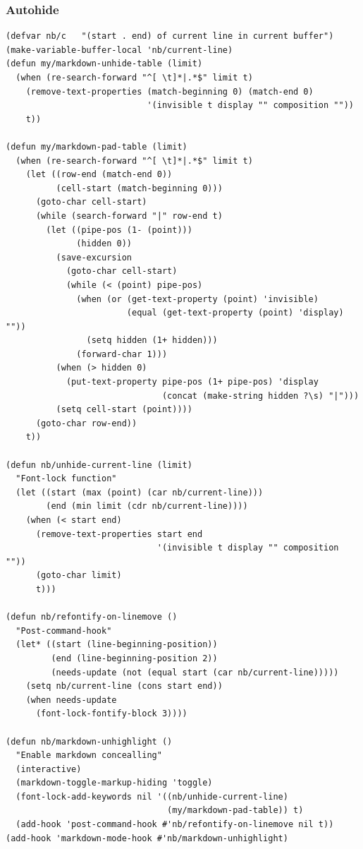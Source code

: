 \documentclass[11pt]{article}
\begin{document}
\subsubsection{Autohide}
\label{sec:orge6439c6}

\begin{verbatim}
(defvar nb/c   "(start . end) of current line in current buffer")
(make-variable-buffer-local 'nb/current-line)
(defun my/markdown-unhide-table (limit)
  (when (re-search-forward "^[ \t]*|.*$" limit t)
    (remove-text-properties (match-beginning 0) (match-end 0)
                            '(invisible t display "" composition ""))
    t))

(defun my/markdown-pad-table (limit)
  (when (re-search-forward "^[ \t]*|.*$" limit t)
    (let ((row-end (match-end 0))
          (cell-start (match-beginning 0)))
      (goto-char cell-start)
      (while (search-forward "|" row-end t)
        (let ((pipe-pos (1- (point)))
              (hidden 0))
          (save-excursion
            (goto-char cell-start)
            (while (< (point) pipe-pos)
              (when (or (get-text-property (point) 'invisible)
                        (equal (get-text-property (point) 'display) ""))
                (setq hidden (1+ hidden)))
              (forward-char 1)))
          (when (> hidden 0)
            (put-text-property pipe-pos (1+ pipe-pos) 'display
                               (concat (make-string hidden ?\s) "|")))
          (setq cell-start (point))))
      (goto-char row-end))
    t))

(defun nb/unhide-current-line (limit)
  "Font-lock function"
  (let ((start (max (point) (car nb/current-line)))
        (end (min limit (cdr nb/current-line))))
    (when (< start end)
      (remove-text-properties start end
                              '(invisible t display "" composition ""))
      (goto-char limit)
      t)))

(defun nb/refontify-on-linemove ()
  "Post-command-hook"
  (let* ((start (line-beginning-position))
         (end (line-beginning-position 2))
         (needs-update (not (equal start (car nb/current-line)))))
    (setq nb/current-line (cons start end))
    (when needs-update
      (font-lock-fontify-block 3))))

(defun nb/markdown-unhighlight ()
  "Enable markdown concealling"
  (interactive)
  (markdown-toggle-markup-hiding 'toggle)
  (font-lock-add-keywords nil '((nb/unhide-current-line)
                                (my/markdown-pad-table)) t)
  (add-hook 'post-command-hook #'nb/refontify-on-linemove nil t))
(add-hook 'markdown-mode-hook #'nb/markdown-unhighlight)
\end{verbatim}
\end{document}
